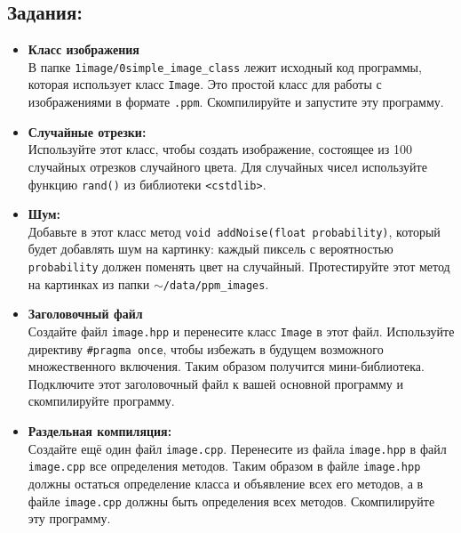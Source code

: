 \documentclass{article}
\begin{document}
\subsection*{Задания:}
\begin{itemize}
\item \textbf{Класс изображения}\\
 В папке \texttt{1image/0simple\_image\_class} лежит исходный код программы, которая использует класс \texttt{Image}. Это простой класс для работы с изображениями в формате \texttt{.ppm}. Скомпилируйте и запустите эту программу.
 
\item \textbf{Случайные отрезки:} \\
Используйте этот класс, чтобы создать изображение, состоящее из 100 случайных отрезков случайного цвета. Для случайных чисел используйте функцию \texttt{rand()} из библиотеки \texttt{<cstdlib>}.

\item \textbf{Шум:}\\
Добавьте в этот класс метод \texttt{void addNoise(float probability)}, который будет добавлять шум на картинку: каждый пиксель с вероятностью \texttt{probability} должен поменять цвет на случайный. Протестируйте этот метод на картинках из папки \texttt{$\sim$/data/ppm\_images}.

\item \textbf{Заголовочный файл} \\
Создайте файл \texttt{image.hpp} и перенесите класс \texttt{Image} в этот файл. Используйте директиву \texttt{\#pragma once}, чтобы избежать в будущем возможного множественного включения. Таким образом получится мини-библиотека. Подключите этот заголовочный файл к вашей основной программу и скомпилируйте программу.

\item \textbf{Раздельная компиляция:} \\
Создайте ещё один файл \texttt{image.cpp}. Перенесите из файла \texttt{image.hpp} в файл \texttt{image.cpp} все определения методов. Таким образом в файле \texttt{image.hpp} должны остаться определение класса и объявление всех его методов, а в файле \texttt{image.cpp} должны быть определения всех методов. Скомпилируйте эту программу.


\end{itemize}
\end{document}
